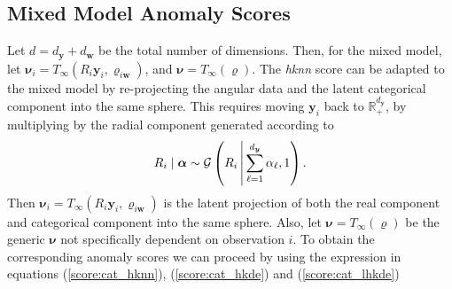 \subsection{Mixed Model Anomaly Scores\label{sec:mixedscores}}
Let $d = d_{\bm{y}} + d_{\bm{w}}$ be the total number of dimensions.  
    Then, for the mixed model, let 
    $\bm{\nu}_i = T_{\infty}(R_i\bm{y}_i, \bm{\varrho}_{i\bm{w}})$, and 
    $\bm{\nu} = T_{\infty}(\bm{\varrho})$.  The \emph{hknn} score can be adapted 
    to the mixed model by re-projecting the angular data and the latent 
    categorical component into the same sphere. This requires moving $\bm{y}_i$ 
    back to $\mathbb{R}_+^{d_{\bm{y}}}$, by multiplying by the radial component
    generated according to
    \begin{equation}
        \label{eqn:angularradial}
        R_i\mid\bm{\alpha} \sim \mathcal{G}
        \left(R_i\,\middle\vert\,\sum_{\ell = 1}^{d_{\bm{y}}}\alpha_{\ell}, 1\right).
    \end{equation}
    Then $\bm{\nu}_i = T_{\infty}(R_i\bm{y}_i, \bm{\varrho}_{i\bm{w}})$ is the 
    latent projection of both the real component and categorical component into 
    the same sphere.  
    Also, let $\bm{\nu} = T_{\infty}(\bm{\varrho})$ be the 
    generic $\bm{\nu}$ not specifically dependent on observation $i$.  To obtain the 
    corresponding anomaly scores we can proceed by using the expression in equations
    (\ref{score:cat_hknn}), (\ref{score:cat_hkde}) and (\ref{score:cat_lhkde}) 

